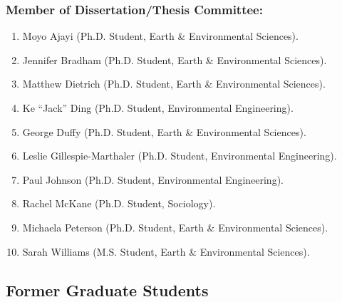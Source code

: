 \documentclass[10pt]{article}
\begin{document}
    \subsubsection{Member of Dissertation/Thesis Committee:}
    \begin{enumerate}
    \item Moyo Ajayi (Ph.D. Student, Earth \& Environmental Sciences).
    \item Jennifer Bradham (Ph.D. Student, Earth \& Environmental Sciences).
    \item Matthew Dietrich (Ph.D. Student, Earth \& Environmental Sciences).
    \item Ke ``Jack'' Ding (Ph.D. Student, Environmental Engineering).
    \item George Duffy (Ph.D. Student, Earth \& Environmental Sciences).
    \item Leslie Gillespie-Marthaler (Ph.D. Student, Environmental Engineering).
    \item Paul Johnson (Ph.D. Student, Environmental Engineering).
    \item Rachel McKane (Ph.D. Student, Sociology).
    \item Michaela Peterson (Ph.D. Student, Earth \& Environmental Sciences).
    \item Sarah Williams (M.S. Student, Earth \& Environmental Sciences).
    \end{enumerate}
    \subsection{Former Graduate Students}
\end{document}
